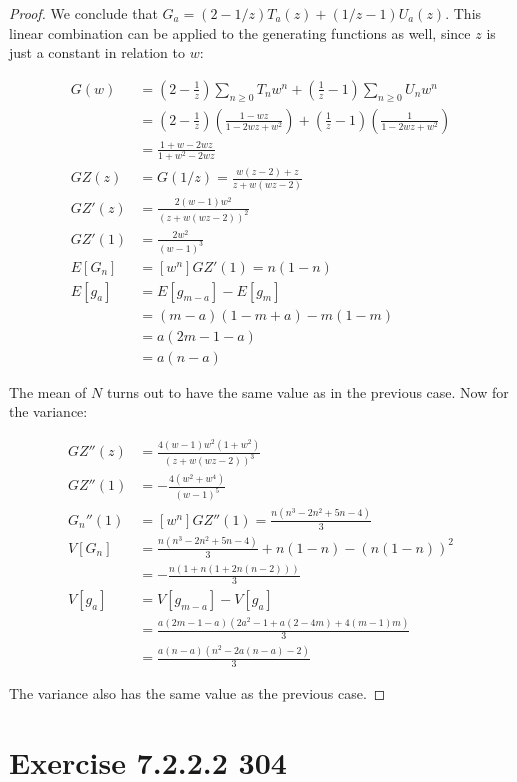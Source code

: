 \documentclass[10pt]{book}
\begin{document}
\begin{proof}
We conclude that $G_a=(2-1/z)T_a(z)+(1/z-1)U_a(z)$. This linear combination can be applied to the generating functions as well, since $z$ is just a constant in relation to $w$:

\begin{align*}
  G(w) &= \left(2-\frac{1}{z}\right)\sum_{n\ge 0}T_n w^n + 
  \left(\frac{1}{z}-1\right)\sum_{n\ge 0}U_n w^n \\
  &=
  \left(2-\frac{1}{z}\right)\left(\frac{1-wz}{1-2wz+w^2}\right) + 
  \left(\frac{1}{z}-1\right)\left(\frac{1}{1-2wz+w^2}\right) \\
  &= \frac{1+w-2wz}{1+w^2-2wz} \\
  GZ(z)&=G(1/z) = \frac{w(z-2)+z}{z+w(wz-2)} \\
  GZ'(z) &= \frac{2(w-1)w^2}{(z+w(wz-2))^2} \\
  GZ'(1) &= \frac{2w^2}{(w-1)^3} \\
  E[G_n] &= [w^n]GZ'(1) = n(1-n) \\
  E[g_a] &= E[g_{m-a}] - E[g_m] \\
   &= (m-a)(1-m+a)-m(1-m) \\
   &= a(2m-1-a)\\
   &= a(n-a)
\end{align*}

The mean of $N$ turns out to have the same value as in the previous case. Now for the variance:

\begin{align*}
  GZ''(z) &= \frac{4(w-1)w^2(1+w^2)}{(z+w(wz-2))^3} \\
  GZ''(1) &= -\frac{4(w^2+w^4)}{(w-1)^5} \\
  G_n''(1) &= [w^n]GZ''(1) = 
  \frac{n(n^3-2n^2+5n-4)}{3} \\
  V[G_n] &= 
  \frac{n(n^3-2n^2+5n-4)}{3} +n(1-n) - (n(1-n))^2 \\
  &=-\frac{n(1+n(1+2n(n-2)))}{3} \\
  V[g_a] &= V[g_{m-a}] - V[g_a] \\
         &= \frac{a(2m-1-a)(2a^2-1+a(2-4m)+4(m-1)m)}{3} \\
         &= \frac{a(n-a)(n^2-2a(n-a)-2)}{3}
\end{align*}

The variance also has the same value as the previous case.

\end{proof}

\section{Exercise 7.2.2.2 304}
\end{document}
